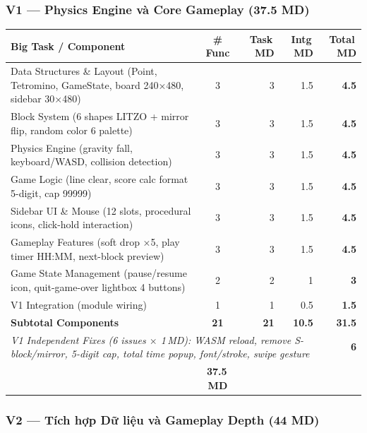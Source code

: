 \documentclass[12pt,a4paper]{article}
\begin{document}
\subsubsection{V1 — Physics Engine và Core Gameplay (37.5 MD)}

\begin{tabularx}{\linewidth}{|X|c|r|r|r|}
\hline
\rowcolor{coreViolet!18}
\textbf{Big Task / Component} & \textbf{\# Func} & \textbf{Task\,MD} & \textbf{Intg\,MD} & \textbf{Total\,MD} \\
\hline
\rowcolor{rowLight}
Data Structures \& Layout (Point, Tetromino, GameState, board 240×480, sidebar 30×480) & 3 & 3 & 1.5 & \textbf{4.5} \\
Block System (6 shapes LITZO + mirror flip, random color 6 palette) & 3 & 3 & 1.5 & \textbf{4.5} \\
\rowcolor{rowLight}
Physics Engine (gravity
fall, keyboard/WASD, collision detection) & 3 & 3 & 1.5 & \textbf{4.5} \\
Game Logic (line clear, score calc format 5-digit, cap 99999) & 3 & 3 & 1.5 & \textbf{4.5} \\
\rowcolor{rowLight}
Sidebar UI \& Mouse (12 slots, procedural icons, click-hold interaction) & 3 & 3 & 1.5 & \textbf{4.5} \\
Gameplay Features (soft drop ×5, play timer HH:MM, next-block preview) & 3 & 3 & 1.5 & \textbf{4.5} \\
\rowcolor{rowLight}
Game State Management (pause/resume icon, quit-game-over lightbox 4 buttons) & 2 & 2 & 1 & \textbf{3} \\
V1 Integration (module wiring) & 1 & 1 & 0.5 & \textbf{1.5} \\
\hline
\rowcolor{coreViolet!12}
\textbf{Subtotal Components} & \textbf{21} &
\textbf{21} & \textbf{10.5} & \textbf{31.5} \\
\hline
\multicolumn{4}{|p{0.82\linewidth}|}{\raggedright \textit{V1 Independent Fixes (6 issues $\times$ 1\,MD): WASM reload, remove S-block/mirror, 5-digit cap, total time popup, font/stroke, swipe gesture}} & \textbf{6} \\
\hline
\rowcolor{v1green!15}
\multicolumn{4}{|l|}{\textbf{V1 Grand Total}} & \textbf{37.5\,MD} \\
\hline
\end{tabularx}

\subsubsection{V2 — Tích hợp Dữ liệu và Gameplay Depth (44 MD)}
\end{document}
